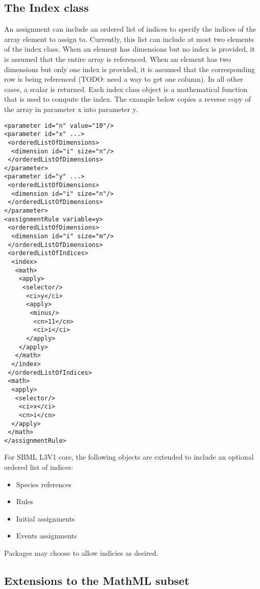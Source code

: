 \subsection{The Index class}

An assignment can include an ordered list of indices to specify the indices of the array element to assign to.  Currently, this list can include at most two elements of the index class.  When an element has dimensions but no index is provided, it is assumed that the entire array is referenced.  When an element has two dimensions but only one index is provided, it is assumed that the corresponding row is being referenced (TODO: need a way to get one column).  In all other cases, a scalar is returned.  Each index class object is a mathematical function that is used to compute the index.  The example below copies a reverse copy of the array in parameter x into parameter y.
\begin{verbatim} 
<parameter id="n" value="10"/>
<parameter id="x" ...>
 <orderedListOfDimensions>
  <dimension id="i" size="n"/>
 </orderedListOfDimensions>
</parameter>
<parameter id="y" ...>
 <orderedListOfDimensions>
  <dimension id="i" size="n"/>
 </orderedListOfDimensions>
</parameter>
<assignmentRule variable=y>
 <orderedListOfDimensions>
  <dimension id="i" size="m"/>
 </orderedListOfDimensions>
 <orderedListOfIndices>
  <index>
   <math>
    <apply>
     <selector/>
      <ci>y</ci>
      <apply>
       <minus/>
        <cn>11</cn>
        <ci>i</ci>
      </apply>
    </apply>
   </math>
  </index>
 </orderedListOfIndices>
 <math>
  <apply>
   <selector/>
    <ci>x</ci>
    <cn>i</cn>
  </apply>
 </math> 
</assignmentRule>
\end{verbatim}

For SBML L3V1 core, the following objects are extended to include an optional ordered list of indices:
\begin{itemize}
\item Species references
\item Rules
\item Initial assignments
\item Events assignments
\end{itemize}
Packages may choose to allow indicies as desired.  

\subsection{Extensions to the MathML subset}

